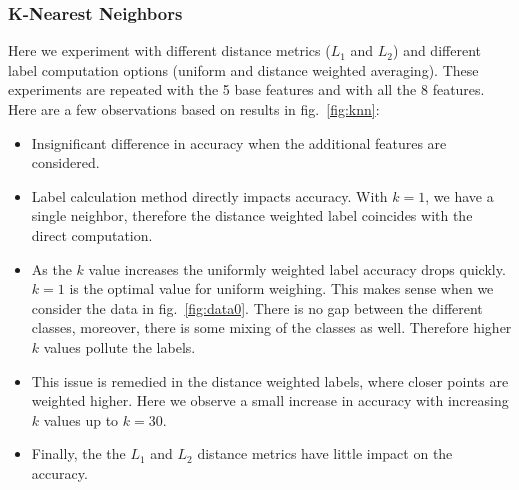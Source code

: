 \documentclass{article}
\begin{document}
\subsubsection{K-Nearest Neighbors}
Here we experiment with different distance metrics ($L_1$ and $L_2$) and different label computation options (uniform and distance weighted averaging). These experiments are repeated with the 5 base features and with all the 8 features. Here are a few observations based on results in fig.~\ref{fig:knn}:
\begin{itemize}
\item Insignificant difference in accuracy when the additional features are considered.
\item Label calculation method directly impacts accuracy. With $k=1$, we have a single neighbor, therefore the distance weighted label coincides with the direct computation. 
\item As the $k$ value increases the uniformly weighted label accuracy drops quickly. $k=1$ is the optimal value for uniform weighing. This makes sense when we consider the data in fig.~\ref{fig:data0}. There is no gap between the different classes, moreover, there is some mixing of the classes as well. Therefore higher $k$ values pollute the labels.
\item This issue is remedied in the distance weighted labels, where closer points are weighted higher. Here we observe a small increase in accuracy with increasing $k$ values up to $k=30$.
\item Finally, the the $L_1$ and $L_2$ distance metrics have little impact on the accuracy.
\end{itemize}
\end{document}

